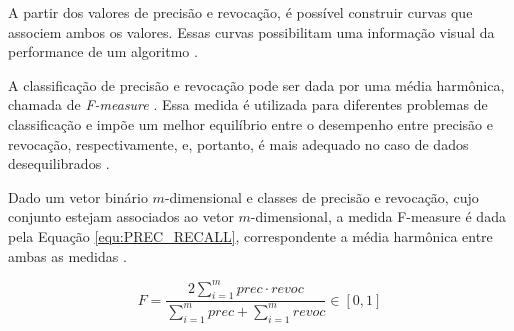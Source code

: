 \begin{document}

A partir dos valores de precisão e revocação, é possível construir curvas que associem ambos os valores. Essas curvas possibilitam uma informação visual da performance de um algoritmo \cite{PRECISION_RECALL}. 

A classificação de precisão e revocação pode ser dada por uma média harmônica, chamada de \textit{F-measure} \cite{F_MEASURE}. Essa medida é utilizada para diferentes problemas de classificação e impõe um melhor equilíbrio entre o desempenho entre precisão e revocação, respectivamente, e, portanto, é mais adequado no caso de dados desequilibrados \cite{F_MEASURE}. 

Dado um vetor binário $m$-dimensional e classes de precisão e revocação, cujo conjunto estejam associados ao vetor $m$-dimensional, a medida F-measure é dada pela Equação \ref{equ:PREC_RECALL}, correspondente a média harmônica entre ambas as medidas \cite{F_MEASURE}.

\begin{equation}
 F=\frac{ 2 \sum\limits_{i=1}^m {prec \cdot revoc}}{ \sum\limits_{i=1}^m {prec} + \sum\limits_{i=1}^m {revoc}}  \in [0,1]
 \label{equ:PREC_RECALL}
\end{equation}

\end{document}
